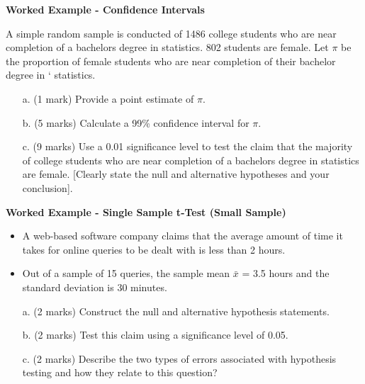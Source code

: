 	\item \textbf{Worked Example   - Confidence Intervals}	
	
	A simple random sample is conducted of 1486 college students who are near completion of a bachelors degree in statistics. 802 students are female. Let $\pi$ be the proportion of female students who are near completion of their bachelor degree in `
	statistics.
	\begin{itemize}
		\item[a.] (1 mark) Provide a point estimate of $\pi$.
		\item[b.] (5 marks) Calculate a 99\% confidence interval for $\pi$.
		\item[c.] (9 marks) Use a 0.01 significance level to test the claim that the majority of
		college students who are near completion of a bachelors degree in statistics are
		female. [Clearly state the null and alternative hypotheses and your conclusion].\end{itemize}
	
	
	\item \textbf{Worked Example  - Single Sample t-Test (Small Sample)  } \\ %
	\begin{itemize}
		\item 	A web-based software company claims that the average amount of time it takes for
		online queries to be dealt with is less than 2 hours. 
		\item Out of a sample of 15 queries, the
		sample mean $\bar{x}$ = 3.5 hours and the standard deviation is 30 minutes.
	\end{itemize}
	
	\begin{itemize}
		\item[a.](2 marks) Construct the null and alternative hypothesis statements.
		\item[b.](2 marks) Test this claim using a significance level of 0.05.
		\item[c.](2 marks) Describe the two types of errors associated with hypothesis testing and how
		they relate to this question?
	\end{itemize}
	
